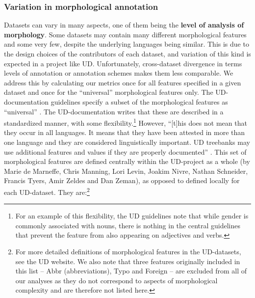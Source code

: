 \documentclass[USenglish]{article}
\begin{document}
\subsubsection{Variation in morphological annotation}\label{sec_appendix:core_features}
Datasets can vary in many aspects, one of them being the \textbf{level of analysis of morphology}. 
Some datasets may contain many different morphological features and some very few, despite the underlying languages being similar. 
This is due to the design choices of the contributors of each dataset, and variation of this kind is expected in a project like UD.
Unfortunately, cross-dataset divergence in terms levels of annotation or annotation schemes makes them less comparable.
We address this by calculating our metrics once for all features specified in a given dataset and once for the ``universal'' morphological features only. 
The UD-documentation guidelines specify a subset of the morphological features as ``universal'' \citep{de_marneffe_universal_2022}. 
The UD-documentation writes that these are described in a standardized manner, with some flexibility.\footnote{For an example of this flexibility, the UD guidelines note that while gender is commonly associated with nouns, there is nothing in the central guidelines that prevent the feature from also appearing on adjectives and verbs.} 
However, ``[t]his does not mean that they occur in all languages. It means that they have been attested in more than one language and they are considered linguistically important. UD treebanks may use additional features and values if they are properly documented'' \citep{de_marneffe_universal_2022}. 
This set of morphological features are defined centrally within the UD-project as a whole (by Marie de Marneffe, Chris Manning, Lori Levin, Joakim Nivre, Nathan Schneider, Francis Tyers, Amir Zeldes and Dan Zeman), as opposed to defined locally for each UD-dataset. 
They are:\footnote{For more detailed definitions of morphological features in the UD-datasets, see the UD website. We also note that three features originally included in this list -- Abbr (abbreviations), Typo and Foreign -- are excluded from all of our analyses as they do not correspond to aspects of morphological complexity and are therefore not listed here.}
\end{document}
